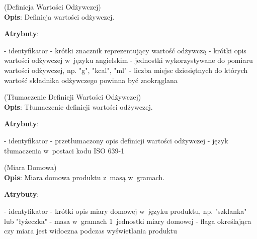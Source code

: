 \begin{enumerate}[label={\textbf{KAT/2/\protect\twodigits{\theenumi}}}, wide, labelwidth=!, labelindent=0pt, labelsep=0pt, series=reqs]
    \label{kat:NutritionDefinition} (Definicja Wartości Odżywczej)\\
    \indent\textbf{Opis}: Definicja wartości odżywczej.
    \par
    \textbf{Atrybuty}:
    \begin{itemize}[series=atr, wide, align=left, leftmargin=190pt]
        \label{kat:NutritionDefinition:id}- identyfikator
        \label{kat:NutritionDefinition:tag}- krótki znacznik reprezentujący wartość odżywczą
        \label{kat:NutritionDefinition:description}- krótki opis wartości odżywczej w~języku angielskim
        \label{kat:NutritionDefinition:units}- jednostki wykorzystywane do pomiaru wartości odżywczej, np. "g", "kcal", "ml"
        \label{kat:NutritionDefinition:decimalPlaces}- liczba miejsc dziesiętnych do których wartość składnika odżywczego powinna być zaokrąglana
    \end{itemize}

    \label{kat:NutritionDefinitionTranslation} (Tłumaczenie Definicji Wartości Odżywczej)\\
    \indent\textbf{Opis}: Tłumaczenie definicji wartości odżywczej.
    \par
    \textbf{Atrybuty}:
    \begin{itemize}[series=atr, wide, align=left, leftmargin=190pt]
        \label{kat:NutritionDefinitionTranslation:id}- identyfikator
        \label{kat:NutritionDefinitionTranslation:translation}- przetłumaczony opis definicji wartości odżywczej
        \label{kat:NutritionDefinitionTranslation:language}- język tłumaczenia w~postaci kodu ISO 639-1
    \end{itemize}

    \label{kat:HouseholdMeasure} (Miara Domowa)\\
    \indent\textbf{Opis}: Miara domowa produktu z~masą w~gramach.
    \par
    \textbf{Atrybuty}:
    \begin{itemize}[series=atr, wide, align=left, leftmargin=190pt]
        \label{kat:HouseholdMeasure:id}- identyfikator
        \label{kat:HouseholdMeasure:description}- krótki opis miary domowej w~języku produktu, np. "szklanka" lub "łyżeczka"
        \label{kat:HouseholdMeasure:gramsWeight}- masa w~gramach 1~jednostki miary domowej
        \label{kat:HouseholdMeasure:isVisible}- flaga określająca czy miara jest widoczna podczas wyświetlania produktu
    \end{itemize}


\end{enumerate}

